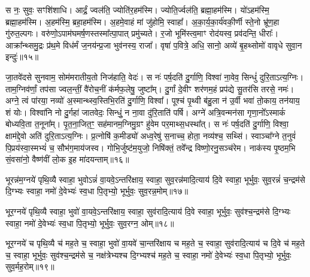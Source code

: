स नः॒ सुवः॒ सꣳशि॑शाधि। 
आर्द्रं॒ ज्वल॑ति॒ ज्योति॑र॒हम॑स्मि। 
ज्योति॒र्ज्वल॑ति॒ ब्रह्मा॒हम॑स्मि। 
यो॑ऽहम॑स्मि॒ ब्रह्मा॒हम॑स्मि। 
अ॒हम॑स्मि॒ ब्रहा॒हम॑स्मि। 
अ॒हमे॒वाहं मां जु॑होमि॒ स्वाहा᳚। 
अ॒का॒र्य॒का॒र्य॑वकी॒र्णी स्ते॒नो भ्रू॑ण॒हा गु॑रुत॒ल्पगः। 
वरु॑णो॒ऽपाम॑घ\-मर्\mbox{}ष॒णस्तस्मा᳚त्पा॒पात् प्रमु॑च्यते। 
र॒जो भूमि॑स्त्व॒माꣳ रोद॑यस्व॒ प्रव॑दन्ति॒ धीराः᳚। 
आक्रा᳚न्थ्समु॒द्रः प्र॑थ॒मे विध॑र्मं ज॒नय॑न्प्र॒जा भुव॑नस्य॒ राजा᳚। 
वृषा॑ प॒वित्रे॒ अधि॒ सानो॒ अव्ये॑ बृ॒हथ्सोमो॑ वावृधे सुवा॒न इन्दुः॑॥१५॥
\anuvakamend

 जा॒तवे॑दसे सुनवाम॒ सोम॑मरातीय॒तो निज॑हाति॒ वेदः॑। 
 स नः॑ पर्\mbox{}ष॒दति॑ दु॒र्गाणि॒ विश्वा॑ ना॒वेव॒ सिन्धुं॑ दुरि॒ताऽत्य॒ग्निः। 
 ताम॒ग्निव॑र्णां॒ तप॑सा ज्वल॒न्तीं॒ वै॑रोच॒नीं क॑र्मफ॒लेषु॒ जुष्टा᳚म्। 
 दु॒र्गां दे॒वीꣳ शर॑णम॒हं प्रप॑द्ये सु॒तर॑सि तरसे॒ नमः॑। 
 अग्ने॒ त्वं पा॑रया॒ नव्यो॑ अ॒स्मान्थ्स्व॒स्तिभि॒रति॑ दु॒र्गाणि॒ विश्वा᳚। 
 पूश्च॑ पृ॒थ्वी ब॑हु॒ला न॑ उ॒र्वी भवा॑ तो॒काय॒ तन॑याय॒ शं योः। 
 विश्वा॑नि नो दु॒र्गहा॑ जातवेदः॒ सिन्धुं॒ न ना॒वा दु॑रि॒ताति॑ पर्\mbox{}षि। 
 अग्ने॑ अत्रि॒वन्मन॑सा गृणा॒नो᳚ऽस्माकं॑ बोध्यवि॒ता त॒नूना᳚म्। 
 पृ॒त॒ना॒जित॒ꣳ॒ सह॑मानम॒ग्निमु॒ग्रꣳ हु॑वेम पर॒माथ्स॒धस्था᳚त्। 
 स नः॑ पर्\mbox{}ष॒दति॑ दु॒र्गाणि॒ विश्वा॒ क्षाम॑द्दे॒वो अति॑ दुरि॒ताऽत्य॒ग्निः। 
 प्र॒त्नोषि॑ क॒मीड्यो॑ अध्व॒रेषु॑ स॒नाच्च॒ होता॒ नव्य॑श्च॒ सथ्सि॑। 
 स्वाञ्चा᳚ग्ने त॒नुवं॑ पि॒प्रय॑स्वा॒स्मभ्यं॑ च॒ सौभ॑ग॒माय॑जस्व। 
 गोभि॒र्जुष्ट॑म॒युजो॒ निषि॑क्तं॒ तवे᳚न्द्र विष्णो॒रनु॒सञ्च॑रेम। 
 नाक॑स्य पृ॒ष्ठम॒भि सं॒वसा॑नो॒ वैष्ण॑वीं लो॒क इ॒ह मा॑दयन्ताम्॥१६॥
\anuvakamend%


भूरन्न॑म॒ग्नये॑ पृथि॒व्यै स्वाहा॒ भुवोऽन्नं॑ वा॒यवे॒ऽन्तरि॑क्षाय॒ स्वाहा॒ सुव॒रन्न॑मादि॒त्याय॑ दि॒वे स्वाहा॒ भूर्भुवः॒ सुव॒रन्नं॑ च॒न्द्रम॑से दि॒ग्भ्यः स्वाहा॒ नमो॑ दे॒वेभ्यः॑ स्व॒धा पि॒तृभ्यो॒ भूर्भुवः॒ सुव॒रन्न॒मोम्॥१७॥
\anuvakamend

भूर॒ग्नये॑ पृथि॒व्यै स्वाहा॒ भुवो॑ वा॒यवे॒ऽन्तरि॑क्षाय॒ स्वाहा॒ सुव॑रादि॒त्याय॑ दि॒वे स्वाहा॒ भूर्भुवः॒ सुव॑श्च॒न्द्रम॑से दि॒ग्भ्यः स्वाहा॒ नमो॑ दे॒वेभ्यः॑ स्व॒धा पि॒तृभ्यो॒ भूर्भुवः॒ सुव॒रग्न॒ ओम्॥१८॥
\anuvakamend

भूर॒ग्नये॑ च पृथि॒व्यै च॑ मह॒ते च॒ स्वाहा॒ भुवो॑ वा॒यवे॑ चा॒न्तरि॑क्षाय च मह॒ते च॒ स्वाहा॒ सुव॑रादि॒त्याय॑ च दि॒वे च॑ मह॒ते च॒ स्वाहा॒ भूर्भुवः॒ सुव॑श्च॒न्द्रम॑से च॒ नक्ष॑त्रेभ्यश्च दि॒ग्भ्यश्च॑ मह॒ते च॒ स्वाहा॒ नमो॑ दे॒वेभ्यः॑ स्व॒धा पि॒तृभ्यो॒ भूर्भुवः॒ सुव॒र्मह॒रोम्॥१९॥ 
\anuvakamend

